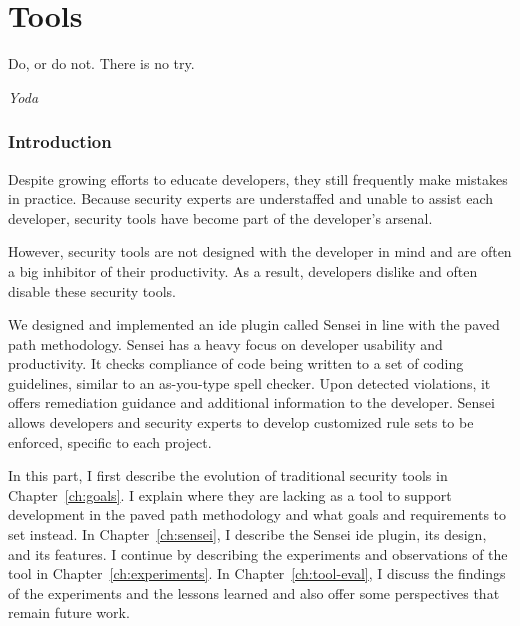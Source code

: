 \part{Tools}
\label{p:tools}
\epigraph{Do, or do not. There is no try.}{\textit{Yoda}}

\clearpage
\section*{Introduction}

Despite growing efforts to educate developers, they still frequently make mistakes in practice.
Because security experts are understaffed and unable to assist each developer, security tools have become part of the developer's arsenal.

However, security tools are not designed with the developer in mind and are often a big inhibitor of their productivity. As a result, developers dislike and often disable these security tools. 


We designed and implemented an \gls{ide} plugin called Sensei in line with the paved path methodology.
Sensei has a heavy focus on developer usability and productivity.
It checks compliance of code being written to a set of coding guidelines, similar to an as-you-type spell checker.
Upon detected violations, it offers remediation guidance and additional information to the developer.
Sensei allows developers and security experts to develop customized rule sets to be enforced, specific to each project.

In this part, I first describe the evolution of traditional security tools in Chapter~\ref{ch:goals}.
I explain where they are lacking as a tool to support development in the paved path methodology and what goals and requirements to set instead.
In Chapter~\ref{ch:sensei}, I describe the Sensei \gls{ide} plugin, its design, and its features.
I continue by describing the experiments and observations of the tool in Chapter~\ref{ch:experiments}.
In Chapter~\ref{ch:tool-eval}, I discuss the findings of the experiments and the lessons learned and also offer some perspectives that remain future work.

%
%

